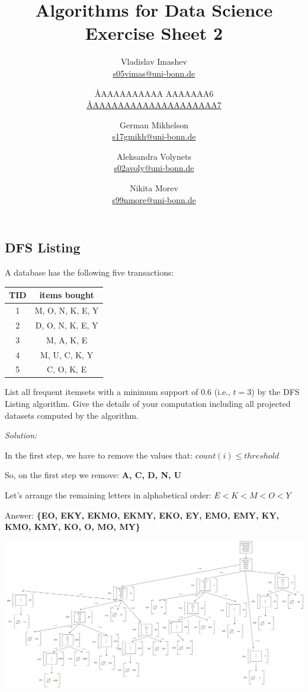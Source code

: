 \documentclass{article}
\title{Algorithms for Data Science \\ Exercise Sheet 2}
\author{
  Vladislav Imashev \\ \href{mailto:s05vimas@uni-bonn.de}{s05vimas@uni-bonn.de} \and
  \AA{AAAAAAAAAA AAAAAAA}{6} \\ \href{mailto:\AA{AAAAAAAAAAAAAAAAAAAA}{7}}{\AA{AAAAAAAAAAAAAAAAAAAA}{7}} \and
  German Mikhelson \\ \href{mailto:s17gmikh@uni-bonn.de}{s17gmikh@uni-bonn.de} \and
  Aleksandra Volynets \\ \href{mailto:s02avoly@uni-bonn.de}{s02avoly@uni-bonn.de} \and
  Nikita Morev \\ \href{mailto:s99nmore@uni-bonn.de}{s99nmore@uni-bonn.de}
}
\begin{document}
  \maketitle

  \setcounter{section}{2}
  \subsection{DFS Listing}
  \begin{centerframebox}
    A database has the following five transactions:

    \begin{center}
      \begin{tabular}{|c|c|}
        \hline
        TID & items bought \\ \hline
        1 & M, O, N, K, E, Y \\ \hline
        2 & D, O, N, K, E, Y \\ \hline
        3 & M, A, K, E \\ \hline
        4 & M, U, C, K, Y \\ \hline
        5 & C, O, K, E \\ \hline
      \end{tabular}
    \end{center}

    List all frequent itemsets with a minimum support of $0.6$ (i.e., $t = 3$) by the
    DFS Listing algorithm. Give the details of your computation including all projected datasets computed by the algorithm.
  \end{centerframebox}
  \textit{Solution:}

  In the first step, we have to remove the values that: $count(i) \leq threshold$

  So, on the first step we remove: \textbf{A, C, D, N, U}

  Let's arrange the remaining letters in alphabetical order:
  $E < K < M < O < Y$

  Answer: \textbf{\{EO, EKY, EKMO, EKMY, EKO, EY, EMO, EMY, KY, KMO, KMY, KO, O, MO, MY\}}

  \begin{adjustwidth}{-0.5in}{-0.5in}
    \centering
    \includegraphics[width=1.13\textwidth]{Task1_DS.png}
  \end{adjustwidth}
\end{document}
